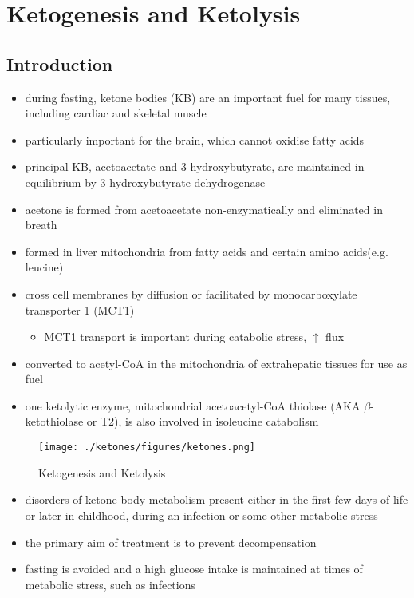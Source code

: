 \documentclass{scrartcl}
\begin{document}
\section{Ketogenesis and Ketolysis}
\label{sec:orgd2cdbd0}
\subsection{Introduction}
\label{sec:orgbd4c308}
\begin{itemize}
\item during fasting, ketone bodies (KB) are an important fuel for many
tissues, including cardiac and skeletal muscle
\item particularly important for the brain, which cannot oxidise fatty acids
\item principal KB, acetoacetate and 3-hydroxybutyrate, are
maintained in equilibrium by 3-hydroxybutyrate dehydrogenase
\item acetone is formed from acetoacetate non-enzymatically and eliminated in breath
\item formed in liver mitochondria from fatty acids and certain amino acids(e.g. leucine)
\item cross cell membranes by diffusion or facilitated by monocarboxylate transporter 1 (MCT1)
\begin{itemize}
\item MCT1 transport is important during catabolic stress, \(\uparrow\) flux
\end{itemize}
\item converted to acetyl-CoA in the mitochondria of extrahepatic tissues for use as fuel
\item one ketolytic enzyme, mitochondrial acetoacetyl-CoA thiolase (AKA
\(\beta\)-ketothiolase or T2), is also involved in isoleucine catabolism
\end{itemize}

\begin{figure}[htbp]
\centering
\texttt{[image: ./ketones/figures/ketones.png]}
\caption{\label{fig:orgd405f89}
Ketogenesis and Ketolysis}
\end{figure}

\begin{itemize}
\item disorders of ketone body metabolism present either in the first few
days of life or later in childhood, during an infection or some
other metabolic stress
\item the primary aim of treatment is to prevent decompensation
\item fasting is avoided and a high glucose intake is maintained at times
of metabolic stress, such as infections
\end{itemize}
\end{document}
